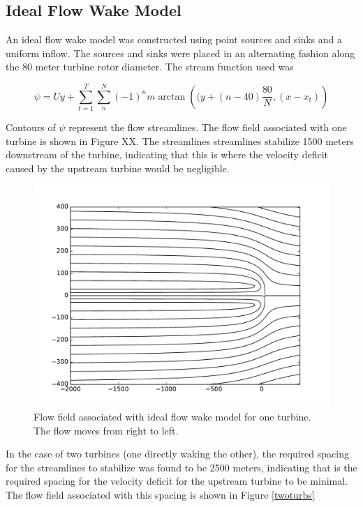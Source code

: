 \documentclass{article}
\begin{document}
\subsection{Ideal Flow Wake Model}
An ideal flow wake model was constructed using point sources and sinks and a uniform inflow. The sources and sinks were placed in an alternating fashion along the 80 meter turbine rotor diameter. The stream function used was

\begin{equation}
\psi = U y + \sum_{t=1}^T \sum_n^N (-1)^n m \arctan\left( (y + (n-40) \frac{80}{N}, (x - x_t)\right) 
\end{equation}

Contours of $\psi$ represent the flow streamlines. The flow field associated with one turbine is shown in Figure XX. The streamlines streamlines stabilize 1500 meters downstream of the turbine, indicating that this is where the velocity deficit caused by the upstream turbine would be negligible.

\begin{figure}[htb!]
\centering
\includegraphics[scale=.4]{oneturb}
\caption{\label{oneturb} Flow field associated with ideal flow wake model for one turbine. The flow moves from right to left.}
\end{figure}

In the case of two turbines (one directly waking the other), the required spacing for the streamlines to stabilize was found to be 2500 meters, indicating that is the required spacing for the velocity deficit for the upstream turbine to be minimal. The flow field associated with this spacing is shown in Figure \ref{twoturbs}
\end{document}
